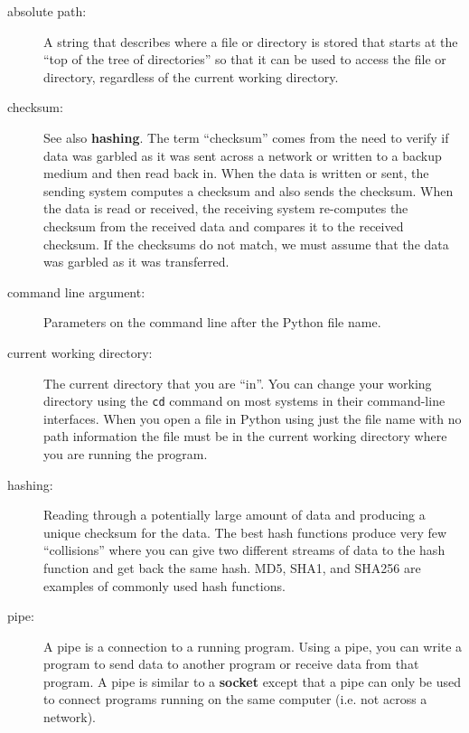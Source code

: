 \begin{description}

\item[absolute path:] A string that describes where a file or
directory is stored that starts at the ``top of the tree of directories''
so that it can be used to access the file or directory, regardless
of the current working directory.

\item[checksum:] See also {\bf hashing}.  The term ``checksum'' 
comes from the need to verify if data was garbled as it was 
sent across a network or written to a backup medium and then
read back in.  When the data is written or sent, the sending system
computes a checksum and also sends the checksum.  When the 
data is read or received, the receiving system re-computes
the checksum from the received data and compares it to the 
received checksum.  If the checksums do not match, we must
assume that the data was garbled as it was transferred.

\item[command line argument:] Parameters on the command line after the Python file name.


\item[current working directory:] The current directory that you 
are ``in''.  You can change your working directory using the 
{\tt cd} command on most systems in their command-line interfaces.
When you open a file in Python using just the file name with no path 
information the file must be in the current working directory
where you are running the program.

\item[hashing:] Reading through a potentially large amount of data
and producing a unique checksum for the data.  The best hash functions
produce very few ``collisions'' where you can give two different
streams of data to the hash function and get back the same hash. 
MD5, SHA1, and SHA256 are examples of commonly used hash functions.

\item[pipe:] A pipe is a connection to a running program.  Using
a pipe, you can write a program to send data to another program
or receive data from that program.  A pipe is similar to a 
{\bf socket} except that a pipe can only be used to 
connect programs running on the same computer (i.e. not
across a network).


\end{description}

